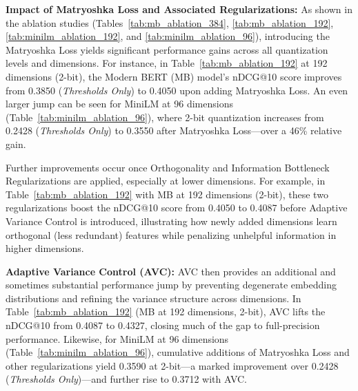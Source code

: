 \textbf{Impact of Matryoshka Loss and Associated Regularizations:} 
As shown in the ablation studies (Tables~\ref{tab:mb_ablation_384}, \ref{tab:mb_ablation_192}, \ref{tab:minilm_ablation_192}, and \ref{tab:minilm_ablation_96}), introducing the Matryoshka Loss yields significant performance gains across all quantization levels and dimensions. 
For instance, in Table~\ref{tab:mb_ablation_192} at 192 dimensions (2-bit), the Modern BERT (MB) model's nDCG@10 score improves from 0.3850 (\textit{Thresholds Only}) to 0.4050 upon adding Matryoshka Loss. 
An even larger jump can be seen for MiniLM at 96 dimensions (Table~\ref{tab:minilm_ablation_96}), where 2-bit quantization increases from 0.2428 (\textit{Thresholds Only}) to 0.3550 after Matryoshka Loss—over a 46\% relative gain.

Further improvements occur once Orthogonality and Information Bottleneck Regularizations are applied, especially at lower dimensions. 
For example, in Table~\ref{tab:mb_ablation_192} with MB at 192 dimensions (2-bit), these two regularizations boost the nDCG@10 score from 0.4050 to 0.4087 before Adaptive Variance Control is introduced, illustrating how newly added dimensions learn orthogonal (less redundant) features while penalizing unhelpful information in higher dimensions.

\noindent
\textbf{Adaptive Variance Control (AVC):}
AVC then provides an additional and sometimes substantial performance jump by preventing degenerate embedding distributions and refining the variance structure across dimensions. 
In Table~\ref{tab:mb_ablation_192} (MB at 192 dimensions, 2-bit), AVC lifts the nDCG@10 from 0.4087 to 0.4327, closing much of the gap to full-precision performance. 
Likewise, for MiniLM at 96 dimensions (Table~\ref{tab:minilm_ablation_96}), cumulative additions of Matryoshka Loss and other regularizations yield 0.3590 at 2-bit—a marked improvement over 0.2428 (\textit{Thresholds Only})—and further rise to 0.3712 with AVC. 


